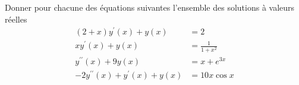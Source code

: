 Donner pour chacune des équations suivantes l'ensemble des solutions à valeurs réelles
\begin{align*}
 (2+x)y^\prime(x) + y(x) &=2 \\
 xy^\prime(x) + y(x) &= \frac{1}{1+x^2} \\
y^{\prime \prime}(x) + 9 y(x) &= x + e^{3x} \\
-2y^{\prime \prime}(x) + y^\prime(x) + y(x) &= 10x \cos x
\end{align*} 